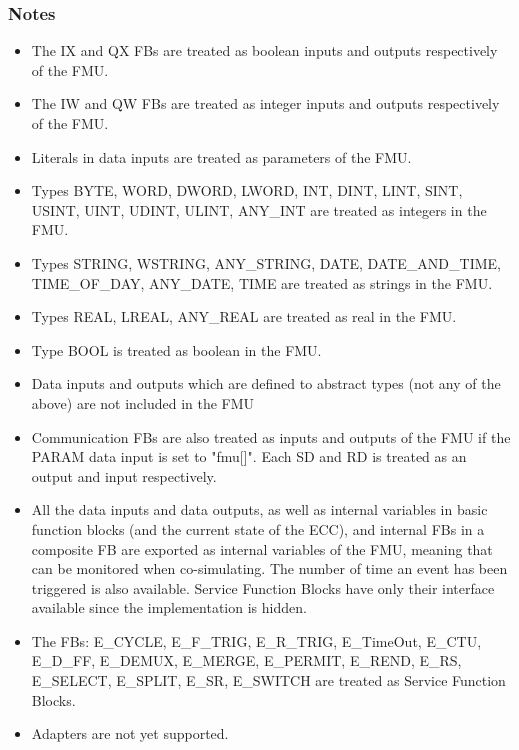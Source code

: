\subsubsection{Notes}\label{sec:simulators:4diac:notes}

\begin{itemize}
  \item The IX and QX FBs are treated as boolean inputs and outputs respectively of the FMU.
  \item The IW and QW FBs are treated as integer inputs and outputs respectively of the FMU.
  \item Literals in data inputs are treated as parameters of the FMU.
  \item Types BYTE, WORD, DWORD, LWORD, INT, DINT, LINT, SINT, USINT, UINT, UDINT, ULINT, ANY\_INT are treated as integers in the FMU.
  \item Types STRING, WSTRING, ANY\_STRING, DATE, DATE\_AND\_TIME, TIME\_OF\_DAY, ANY\_DATE, TIME are treated as strings in the FMU.
  \item Types REAL, LREAL, ANY\_REAL are treated as real in the FMU.
  \item Type BOOL is treated as boolean in the FMU.
  \item Data inputs and outputs which are defined to abstract types (not any of the above) are not included in the FMU
  \item Communication FBs are also treated as inputs and outputs of the FMU if the PARAM data input is set to "fmu[]". Each SD and RD is treated as an output and input respectively.
  \item All the data inputs and data outputs, as well as internal variables in basic function blocks (and the current state of the ECC), and internal FBs in a composite FB are exported as 
  internal variables of the FMU, meaning that can be monitored when co-simulating. The number of time an event has been triggered is also available. Service Function Blocks have only their 
  interface available since the implementation is hidden.
  \item The FBs: E\_CYCLE, E\_F\_TRIG, E\_R\_TRIG, E\_TimeOut, E\_CTU, E\_D\_FF, E\_DEMUX, E\_MERGE, E\_PERMIT, E\_REND, E\_RS, E\_SELECT, E\_SPLIT, E\_SR, E\_SWITCH are treated as Service Function Blocks.
  \item Adapters are not yet supported.
\end{itemize}


\newusoff
